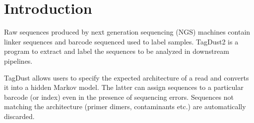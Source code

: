 \documentclass[11pt,a4paper,oneside]{book}
\begin{document}
\tableofcontents
\mainmatter

\chapter{Introduction}


Raw sequences produced by next generation sequencing (NGS) machines contain linker sequences and barcode sequenced used to label samples. TagDust2 is a program to extract and label the sequences to be analyzed in downstream pipelines.

TagDust allows users to specify the expected architecture of a read and converts it into a hidden Markov model. The latter can assign sequences to a particular barcode (or index) even in the presence of sequencing errors. Sequences not matching the architecture (primer dimers, contaminants etc.) are automatically discarded.


\end{document}

